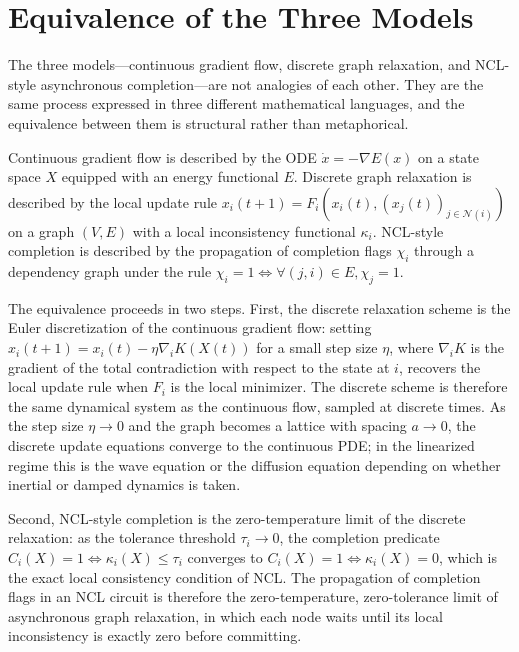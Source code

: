 \documentclass[12pt,a4paper,openany]{book}
\theoremstyle{plain}
\theoremstyle{definition}
\theoremstyle{remark}
\begin{document}
\section{Equivalence of the Three Models}

The three models---continuous gradient flow, discrete graph relaxation, and NCL-style asynchronous completion---are not analogies of each other. They are the same process expressed in three different mathematical languages, and the equivalence between them is structural rather than metaphorical.

Continuous gradient flow is described by the ODE $\dot{x} = -\nabla E(x)$ on a state space $X$ equipped with an energy functional $E$. Discrete graph relaxation is described by the local update rule $x_i(t+1) = F_i(x_i(t), (x_j(t))_{j \in \mathcal{N}(i)})$ on a graph $(V, E)$ with a local inconsistency functional $\kappa_i$. NCL-style completion is described by the propagation of completion flags $\chi_i$ through a dependency graph under the rule $\chi_i = 1 \iff \forall (j, i) \in E, \chi_j = 1$.

The equivalence proceeds in two steps. First, the discrete relaxation scheme is the Euler discretization of the continuous gradient flow: setting $x_i(t+1) = x_i(t) - \eta \nabla_i K(X(t))$ for a small step size $\eta$, where $\nabla_i K$ is the gradient of the total contradiction with respect to the state at $i$, recovers the local update rule when $F_i$ is the local minimizer. The discrete scheme is therefore the same dynamical system as the continuous flow, sampled at discrete times. As the step size $\eta \to 0$ and the graph becomes a lattice with spacing $a \to 0$, the discrete update equations converge to the continuous PDE; in the linearized regime this is the wave equation or the diffusion equation depending on whether inertial or damped dynamics is taken.

Second, NCL-style completion is the zero-temperature limit of the discrete relaxation: as the tolerance threshold $\tau_i \to 0$, the completion predicate $C_i(X) = 1 \iff \kappa_i(X) \leq \tau_i$ converges to $C_i(X) = 1 \iff \kappa_i(X) = 0$, which is the exact local consistency condition of NCL. The propagation of completion flags in an NCL circuit is therefore the zero-temperature, zero-tolerance limit of asynchronous graph relaxation, in which each node waits until its local inconsistency is exactly zero before committing.
\end{document}
